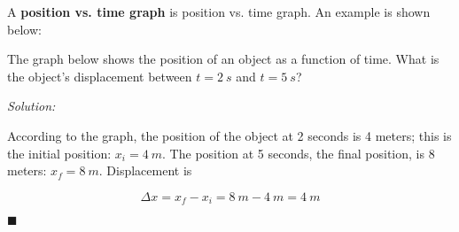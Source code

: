 \documentclass[dvipsnames]{article}
\begin{document}
A \textbf{\gls{position vs. time graph}} is \glsdesc{position vs. time graph}. An example is shown below:

\begin{center}
\end{center}




\begin{example} \label{DYQyq}
The graph below shows the position of an object as a function of time. What is the object's displacement between $t = \SI{2}{s}$ and $t = \SI{5}{s}$?

\begin{center}
\end{center}
\end{example}

\textit{Solution:}

According to the graph, the position of the object at 2 seconds is 4 meters; this is the initial position: $x_i = \SI{4}{m}$. The position at 5 seconds, the final position, is 8 meters: $x_f = \SI{8}{m}$. Displacement is

\begin{equation*}
    \Delta x = x_f - x_i = \SI{8}{m} - \SI{4}{m} = \boxed{\SI{4}{m}}
\end{equation*}

\hfill $\blacksquare$
\end{document}
